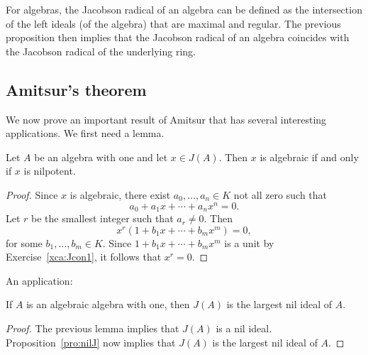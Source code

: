 For algebras, the Jacobson radical of an 
algebra can be defined as 
the intersection of the left ideals (of the algebra) 
that are maximal and regular. The previous 
proposition then implies that the Jacobson radical of an algebra coincides
with the Jacobson radical of the underlying ring. 



\subsection{Amitsur's theorem}

We now prove an important result of Amitsur that
has several interesting applications. We first need a lemma. 

\begin{lemma}
	\label{lemma:algebraico=nil}
	Let $A$ be an algebra with one and let $x\in J(A)$. 
	Then $x$ is algebraic if and only if $x$ is nilpotent. 
\end{lemma}

\begin{proof}
    Since $x$ is algebraic, there exist $a_0,\dots,a_n\in K$ 
    not all zero such that 
    \[
		a_0+a_1x+\cdots+a_nx^n=0.
	\]
	Let $r$ be the smallest integer such that $a_r\ne 0$. Then 
	\[
		x^r(1+b_1x+\cdots+b_mx^m)=0,
	\]
	for some $b_1,\dots,b_m\in K$. Since $1+b_1x+\cdots+b_mx^m$ is a unit by 
	Exercise~\ref{xca:Jcon1}, it follows that $x^r=0$.
\end{proof}

An application:

\begin{proposition}
	\label{pro:algebraica=>Jnil}
	If $A$ is an algebraic algebra with one, then $J(A)$ is the largest nil ideal of $A$.
\end{proposition}

\begin{proof}
	The previous lemma implies that $J(A)$ is a nil ideal. 
	Proposition~\ref{pro:nilJ} now implies that $J(A)$ is the largest nil ideal of $A$. 
\end{proof}


